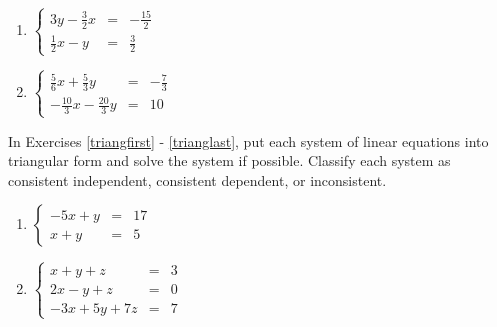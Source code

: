 \begin{multicols}{2}
\begin{enumerate}
\setcounter{enumi}{\value{HW}}

\item  $\left\{ \begin{array}{rcr} 3y-\frac{3}{2}x & = & -\frac{15}{2}  \\ [5pt] \frac{1}{2}x-y & = & \frac{3}{2} \end{array} \right.$   


\item $\left\{ \begin{array}{rcr} \frac{5}{6}x+\frac{5}{3}y & = & -\frac{7}{3}  \\ [5pt] -\frac{10}{3}x-\frac{20}{3}y & = & 10  \end{array} \right.$ \label{reviewsystemlast} 


\setcounter{HW}{\value{enumi}}
\end{enumerate}
\end{multicols}


In Exercises \ref{triangfirst} - \ref{trianglast}, put each system of linear equations into triangular form and solve the system if possible.  Classify each system as consistent independent, consistent dependent, or inconsistent.

\begin{multicols}{2}
\begin{enumerate}
\setcounter{enumi}{\value{HW}}

\item $\left\{ \begin{array}{rcr} -5x + y & = & 17  \\ x + y & = & 5  \end{array} \right.$ \label{triangfirst}
\item $\left\{ \begin{array}{rcr} x + y + z & = & 3 \\ 2x - y + z & = & 0 \\ -3x + 5y + 7z & = & 7  \end{array} \right.$

\setcounter{HW}{\value{enumi}}
\end{enumerate}
\end{multicols}



